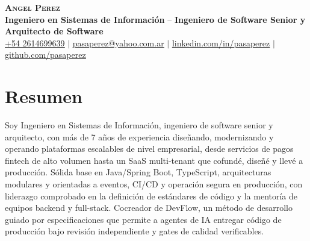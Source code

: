 \documentclass[letterpaper,11pt]{article}
\begin{document}
\begin{center}
    \textbf{\Huge \scshape Angel Perez} \\ \vspace{2pt}
    \small \textbf{Ingeniero en Sistemas de Información}
    --
    \small \textbf{Ingeniero de Software Senior y Arquitecto de Software} \\ \vspace{2pt}
    \small \href{tel:+542614699639}{\underline{+54 2614699639}} $|$ \href{mailto:pasaperez@yahoo.com.ar}{\underline{pasaperez@yahoo.com.ar}} $|$
    \href{https://www.linkedin.com/in/pasaperez}{\underline{linkedin.com/in/pasaperez}} $|$
    \href{https://github.com/pasaperez}{\underline{github.com/pasaperez}}
\end{center}

\section{Resumen}
Soy Ingeniero en Sistemas de Información, ingeniero de software senior y arquitecto, con más de 7 años de experiencia diseñando, modernizando y operando plataformas escalables de nivel empresarial, desde servicios de pagos fintech de alto volumen hasta un SaaS multi-tenant que cofundé, diseñé y llevé a producción. Sólida base en Java/Spring Boot, TypeScript, arquitecturas modulares y orientadas a eventos, CI/CD y operación segura en producción, con liderazgo comprobado en la definición de estándares de código y la mentoría de equipos backend y full-stack. Cocreador de DevFlow, un método de desarrollo guiado por especificaciones que permite a agentes de IA entregar código de producción bajo revisión independiente y gates de calidad verificables.
\end{document}
